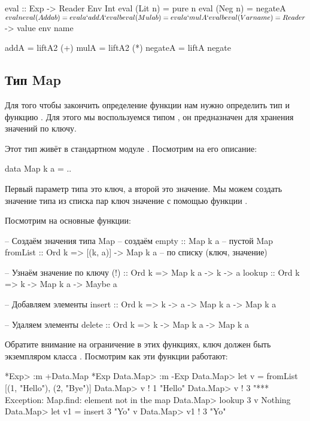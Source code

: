 \begin{code}
eval :: Exp -> Reader Env Int
eval (Lit n)    = pure n
eval (Neg n)    = negateA $ eval n
eval (Add a b)  = eval a `addA` eval b
eval (Mul a b)  = eval a `mulA` eval b
eval (Var name) = Reader $ \env -> value env name    
   
addA      = liftA2 (+)
mulA      = liftA2 (*)  
negateA   = liftA negate  
\end{code}

\subsection{Тип Map}

 Для того чтобы закончить определение
функции  нам нужно определить тип  и функцию
. Для этого мы воспользуемся типом , он предназначен
для хранения значений по ключу.

Этот тип живёт в стандартном модуле . Посмотрим на его
описание:


\begin{code}
data Map k a = ..
\end{code}

Первый параметр типа  это ключ, а второй это значение. Мы можем
создать значение типа  из списка пар ключ значение с помощью
функции .

Посмотрим на основные функции:


\begin{code}
-- Создаём значения типа Map                    -- создаём  
empty :: Map k a                                -- пустой Map
fromList :: Ord k => [(k, a)] -> Map k a        -- по списку (ключ, значение)

-- Узнаём значение по ключу
(!)     :: Ord k => Map k a -> k -> a           
lookup  :: Ord k => k -> Map k a -> Maybe a

-- Добавляем элементы
insert :: Ord k => k -> a -> Map k a -> Map k a

-- Удаляем элементы
delete :: Ord k => k -> Map k a -> Map k a
\end{code}

Обратите внимание на ограничение  в этих функциях, ключ должен
быть экземпляром класса . Посмотрим как эти функции работают:


\begin{code}
*Exp> :m +Data.Map
*Exp Data.Map> :m -Exp
Data.Map> let v = fromList [(1, "Hello"), (2, "Bye")]
Data.Map> v ! 1
"Hello"
Data.Map> v ! 3
"*** Exception: Map.find: element not in the map
Data.Map> lookup 3 v
Nothing
Data.Map> let v1 = insert 3 "Yo" v
Data.Map> v1 ! 3
"Yo"
\end{code}

